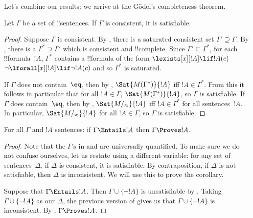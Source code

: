 \documentclass[../../../include/open-logic-section]{subfiles}
\begin{document}

Let's combine our results: we arrive at the G\"odel's completeness theorem.

\begin{thm}
Let $\Gamma$ be a set of !!{sentence}s.  If $\Gamma$ is consistent, it
is satisfiable.
\end{thm}

\begin{proof}
Suppose $\Gamma$ is consistent.  By , there is
a saturated consistent set $\Gamma' \supseteq \Gamma$. By
, there is a $\Gamma^* \supseteq \Gamma'$
which is consistent and !!{complete}.  Since $\Gamma' \subseteq
\Gamma^*$, for each !!{formula}~$!A$, $\Gamma^*$ contains a
!!{formula} of the form
{$\lexists[x][!A] \lif !A(c)$}
{$\lnot\lforall[x][!A] \lif \lnot !A(c)$}
and so $\Gamma^*$ is saturated.

If $\Gamma$ does not contain~$\eq$, then by ,
$\Sat{M(\Gamma^*)}{!A}$ iff $!A \in \Gamma^*$.  From this it follows
in particular that for all $!A \in \Gamma$, $\Sat{M(\Gamma^*)}{!A}$,
so $\Gamma$ is satisfiable.  If $\Gamma$ does contain~$\eq$, then by
, $\Sat{M/_\approx}{!A}$ iff $!A \in \Gamma^*$
for all sentences~$!A$.  In particular, $\Sat{M/_\approx}{!A}$ for all
$!A \in \Gamma$, so $\Gamma$ is satisfiable.
\end{proof}

\begin{cor}
For all $\Gamma$ and $!A$ sentences: if $\Gamma \Entails !A$ then
$\Gamma \Proves !A$.
\end{cor}

\begin{proof}
Note that the $\Gamma$'s in  and
 are universally quantified.  To make sure we
do not confuse ourselves, let us restate 
using a different variable: for any set of sentences~$\Delta$, if
$\Delta$ is consistent, it is satisfiable.  By contraposition, if
$\Delta$ is not satisfiable, then $\Delta$ is inconsistent.  We will
use this to prove the corollary.

Suppose that $\Gamma \Entails !A$.  Then $\Gamma \cup \{\lnot !A\}$ is
unsatisfiable by .  Taking $\Gamma
\cup \{\lnot !A\}$ as our $\Delta$, the previous version of
 gives us that $\Gamma \cup \{\lnot !A\}$ is
inconsistent.  By
,
$\Gamma \Proves !A$.
\end{proof}
\end{document}
